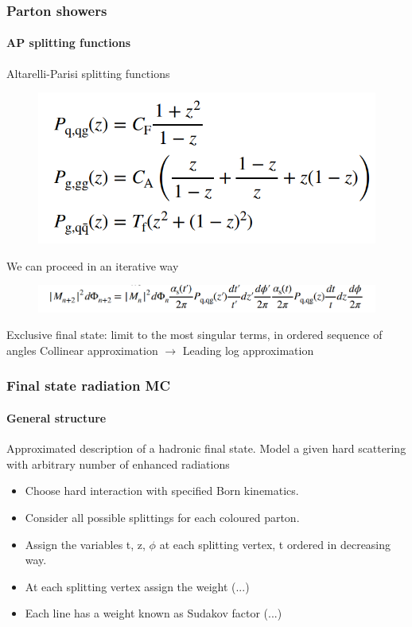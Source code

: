 \documentclass[aspectratio=43]{beamer}
\begin{document}
\begin{frame}

	\frametitle{Parton showers}
	\framesubtitle{AP splitting functions}
	
	Altarelli-Parisi splitting functions
	
	\begin{figure}
		\includegraphics[width = 5 cm]{plots/AP_splitting.png}
	\end{figure}

	We can proceed in an iterative way
	\begin{figure}
		\includegraphics[width = 9 cm]{plots/AP_iteration.png}
	\end{figure}

	\footnotesize Exclusive final state: limit to the most singular terms, in ordered sequence of angles
	\color{red} Collinear approximation $\longrightarrow$ Leading log approximation
	
\end{frame}

\begin{frame}

	\frametitle{Final state radiation MC}
	\framesubtitle{General structure}
	
	\footnotesize Approximated description of a hadronic final state. Model a given hard scattering with arbitrary number of enhanced radiations

	\begin{itemize} 
		\item Choose hard interaction with specified Born kinematics.
		\item Consider all possible splittings for each coloured parton.
		\item Assign the variables t, z, $\phi$ at each splitting vertex, t ordered in decreasing way.
		\item At each splitting vertex assign the weight (...)
		\item Each line has a weight known as Sudakov factor (...)
	\end{itemize}

\end{frame}
\end{document}
